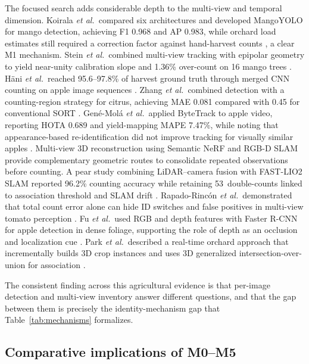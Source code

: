 The focused search adds considerable depth to the multi-view and temporal dimension. Koirala \textit{et al.}\ compared six architectures and developed MangoYOLO for mango detection, achieving F1 0.968 and AP 0.983, while orchard load estimates still required a correction factor against hand-harvest counts \cite{koirala2019deepfruit}, a clear M1 mechanism. Stein \textit{et al.}\ combined multi-view tracking with epipolar geometry to yield near-unity calibration slope and 1.36\% over-count on 16 mango trees \cite{ledger_r_408d13511cac4177}. H\"ani \textit{et al.}\ reached 95.6--97.8\% of harvest ground truth through merged CNN counting on apple image sequences \cite{ledger_r_1358c0868a62c84a}. Zhang \textit{et al.}\ combined detection with a counting-region strategy for citrus, achieving MAE 0.081 compared with 0.45 for conventional SORT \cite{ledger_r_ee550a3e3a6fb318}. Gené-Molá \textit{et al.}\ applied ByteTrack to apple video, reporting HOTA 0.689 and yield-mapping MAPE 7.47\%, while noting that appearance-based re-identification did not improve tracking for visually similar apples \cite{ledger_r_2d972b94554c6cd1}. Multi-view 3D reconstruction using Semantic NeRF \cite{ledger_m_1210e3ea00486b68} and RGB-D SLAM \cite{ledger_r_b2e0e9aabad17a97} provide complementary geometric routes to consolidate repeated observations before counting. A pear study combining LiDAR--camera fusion with FAST-LIO2 SLAM reported 96.2\% counting accuracy while retaining 53~double-counts linked to association threshold and SLAM drift \cite{ledger_r_d4270ea8ab11f268}. Rapado-Rincón \textit{et al.}\ demonstrated that total count error alone can hide ID switches and false positives in multi-view tomato perception \cite{ledger_r_700d34dae0f20d78}. Fu \textit{et al.}\ used RGB and depth features with Faster R-CNN for apple detection in dense foliage, supporting the role of depth as an occlusion and localization cue \cite{fu2020apple}. Park \textit{et al.}\ described a real-time orchard approach that incrementally builds 3D crop instances and uses 3D generalized intersection-over-union for association \cite{park2026cropassociation}.

The consistent finding across this agricultural evidence is that per-image detection and multi-view inventory answer different questions, and that the gap between them is precisely the identity-mechanism gap that Table~\ref{tab:mechanisms} formalizes.

\subsection{Comparative implications of M0--M5}

